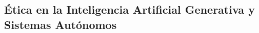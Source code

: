 \begin{refsection}
\chapter{Ética en la Inteligencia Artificial Generativa y Sistemas Autónomos}
\label{chapter:chapter-5}


\begin{comment}
\begin{enumerate}
\item \textbf{Ética en la Inteligencia Artificial Generativa y Sistemas Autónomos (Capítulo 5):}  
\begin{itemize}
    \item Exploración de IA generativa y sistemas autónomos (drones, LAWS).
    \item Análisis ético de derechos de autoría y responsabilidad en sistemas autónomos.
    \item Uso de explicabilidad para entender y regular decisiones autónomas.
    \item Actividad: Crear una simulación con \texttt{gym} para evaluar escenarios éticos en decisiones autónomas.
\end{itemize}
\end{enumerate}
\end{comment}



\nocite{*}

\printbibliography[heading=subbibliography, title={Bibliografía del Capítulo 5}]
\end{refsection}
